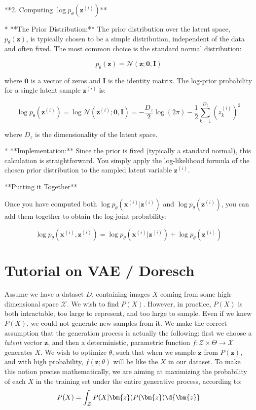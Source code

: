 \documentclass{article}
\begin{document}
**2. Computing $\log p_{\theta}(\mathbf{z}^{(i)})$**

*   **The Prior Distribution:**  The prior distribution over the latent space, $p_{\theta}(\mathbf{z})$, is typically chosen to be a simple distribution, independent of the data and often fixed. The most common choice is the standard normal distribution:

    \[
    p_{\theta}(\mathbf{z}) = \mathcal{N}(\mathbf{z} ; \mathbf{0}, \mathbf{I})
    \]

    where $\mathbf{0}$ is a vector of zeros and $\mathbf{I}$ is the identity matrix. The log-prior probability for a single latent sample $\mathbf{z}^{(i)}$ is:

    \[
    \log p_{\theta}(\mathbf{z}^{(i)}) = \log \mathcal{N}(\mathbf{z}^{(i)} ; \mathbf{0}, \mathbf{I}) = -\frac{D_z}{2} \log(2\pi) - \frac{1}{2} \sum_{k=1}^{D_z} (z_k^{(i)})^2
    \]

    where $D_z$ is the dimensionality of the latent space.

*   **Implementation:**  Since the prior is fixed (typically a standard normal), this calculation is straightforward. You simply apply the log-likelihood formula of the chosen prior distribution to the sampled latent variable $\mathbf{z}^{(i)}$.

**Putting it Together**

Once you have computed both $\log p_{\theta}(\mathbf{x}^{(i)} | \mathbf{z}^{(i)})$ and $\log p_{\theta}(\mathbf{z}^{(i)})$, you can add them together to obtain the log-joint probability:

\[
\log p_{\theta}(\mathbf{x}^{(i)}, \mathbf{z}^{(i)}) = \log p_{\theta}(\mathbf{x}^{(i)} | \mathbf{z}^{(i)}) + \log p_{\theta}(\mathbf{z}^{(i)})
\]

\newpage
\section{Tutorial on VAE / Doresch}
Assume we have a dataset $D$, containing images $X$ coming from some high-dimensional space $\mathcal{X}$. 
We wish to find $P(X)$. 
However, in practice, $P(X)$ is both intractable, too large to represent, and too large to sample. 
Even if we knew $P(X)$, we could not generate new samples from it. 
We make the correct assumption that the generation process is actually the following: first we choose a \textit{latent} vector $\bm{z}$, and then a deterministic, parametric function $f : \mathcal{Z} \times \Theta \to \mathcal{X}$ generates $X$. 
We wish to optimize $\theta$, such that when we sample $\bm{z}$ from $P(\bm{z})$, and with high probability, $f(\bm{z} ; \theta)$  will be like the $X$ in our dataset. 
To make this notion precise mathematically, we are aiming at maximizing the probability of each $X$ in the training set under the entire generative process, according to:
\[
  P(X) = \int_{\mathcal{Z}} P(X | \bm{z}) P(\bm{z}) \d{\bm{z}}
\]
\end{document}
